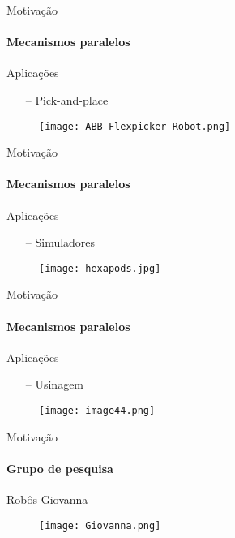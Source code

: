 \documentclass[25pt,landscape]{beamer}
\begin{document}
\begin{frame}{Motiva\c{c}\~ao}
    \framesubtitle{Mecanismos paralelos}
    \begin{block}{Aplica\c{c}\~oes}
        \begin{itemize}
            \item[--] Pick-and-place
        \end{itemize}
    \end{block}
    \begin{figure}[!h]
        \centering
        \texttt{[image: ABB-Flexpicker-Robot.png]}
    \end{figure}  
\end{frame}

\begin{frame}{Motiva\c{c}\~ao}
    \framesubtitle{Mecanismos paralelos}
    \begin{block}{Aplica\c{c}\~oes}
        \begin{itemize}
            \item[--] Simuladores
        \end{itemize}
    \end{block}
    \begin{figure}[!h]
        \centering
        \texttt{[image: hexapods.jpg]}
    \end{figure}  
\end{frame}

\begin{frame}{Motiva\c{c}\~ao}
    \framesubtitle{Mecanismos paralelos}
    \begin{block}{Aplica\c{c}\~oes}
        \begin{itemize}
            \item[--] Usinagem
        \end{itemize}
    \end{block}
    \begin{figure}[!h]
        \centering
        \texttt{[image: image44.png]}
    \end{figure}  
\end{frame}


\begin{frame}{Motiva\c{c}\~ao}
	\framesubtitle{Grupo de pesquisa}
	\pause
	\begin{block}{Rob\^os}
		Giovanna
    \end{block}
    \begin{figure}[!h]
        \centering
        \texttt{[image: Giovanna.png]}
    \end{figure}
\end{frame}
\end{document}
